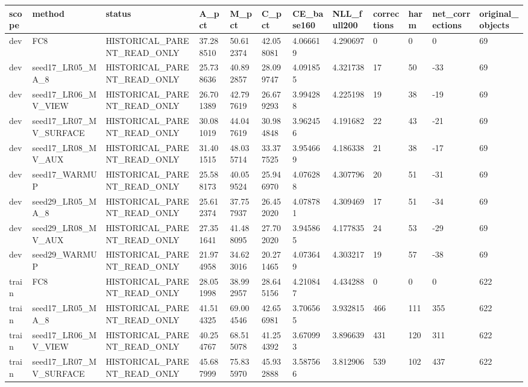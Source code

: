 \begin{tabular}{llllllllllll}
\toprule
scope & method & status & A\_pct & M\_pct & C\_pct & CE\_base160 & NLL\_full200 & corrections & harm & net\_corrections & original\_objects \\
\midrule
dev & FC8 & HISTORICAL\_PARENT\_READ\_ONLY & 37.288510 & 50.612374 & 42.058081 & 4.066619 & 4.290697 & 0 & 0 & 0 & 69 \\
dev & seed17\_LR05\_MA\_8 & HISTORICAL\_PARENT\_READ\_ONLY & 25.738636 & 40.892857 & 28.099747 & 4.091855 & 4.321738 & 17 & 50 & -33 & 69 \\
dev & seed17\_LR06\_MV\_VIEW & HISTORICAL\_PARENT\_READ\_ONLY & 26.701389 & 42.797619 & 26.679293 & 3.994288 & 4.225198 & 19 & 38 & -19 & 69 \\
dev & seed17\_LR07\_MV\_SURFACE & HISTORICAL\_PARENT\_READ\_ONLY & 30.081019 & 44.047619 & 30.984848 & 3.962456 & 4.191682 & 22 & 43 & -21 & 69 \\
dev & seed17\_LR08\_MV\_AUX & HISTORICAL\_PARENT\_READ\_ONLY & 31.401515 & 48.035714 & 33.377525 & 3.954669 & 4.186338 & 21 & 38 & -17 & 69 \\
dev & seed17\_WARMUP & HISTORICAL\_PARENT\_READ\_ONLY & 25.588173 & 40.059524 & 25.946970 & 4.076288 & 4.307796 & 20 & 51 & -31 & 69 \\
dev & seed29\_LR05\_MA\_8 & HISTORICAL\_PARENT\_READ\_ONLY & 25.612374 & 37.757937 & 26.452020 & 4.078781 & 4.309469 & 17 & 51 & -34 & 69 \\
dev & seed29\_LR08\_MV\_AUX & HISTORICAL\_PARENT\_READ\_ONLY & 27.351641 & 41.488095 & 27.702020 & 3.945865 & 4.177835 & 24 & 53 & -29 & 69 \\
dev & seed29\_WARMUP & HISTORICAL\_PARENT\_READ\_ONLY & 21.974958 & 34.623016 & 20.271465 & 4.073649 & 4.303217 & 19 & 57 & -38 & 69 \\
train & FC8 & HISTORICAL\_PARENT\_READ\_ONLY & 28.051998 & 38.992957 & 28.645156 & 4.210847 & 4.434288 & 0 & 0 & 0 & 622 \\
train & seed17\_LR05\_MA\_8 & HISTORICAL\_PARENT\_READ\_ONLY & 41.514325 & 69.004546 & 42.656981 & 3.706565 & 3.932815 & 466 & 111 & 355 & 622 \\
train & seed17\_LR06\_MV\_VIEW & HISTORICAL\_PARENT\_READ\_ONLY & 40.254767 & 68.515078 & 41.254392 & 3.670993 & 3.896639 & 431 & 120 & 311 & 622 \\
train & seed17\_LR07\_MV\_SURFACE & HISTORICAL\_PARENT\_READ\_ONLY & 45.687999 & 75.835970 & 45.932888 & 3.587566 & 3.812906 & 539 & 102 & 437 & 622 \\

\end{tabular}
